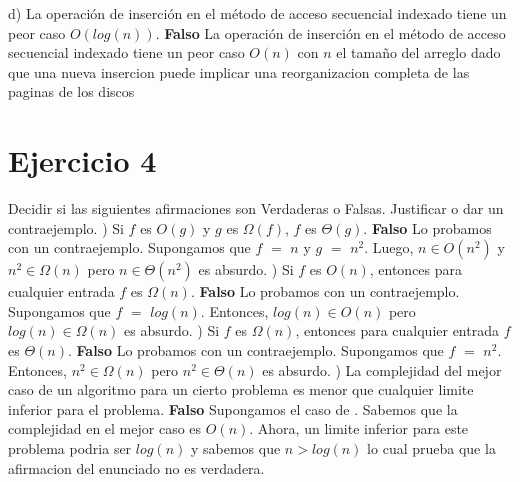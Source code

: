 \documentclass[10pt,a4paper]{article}
\begin{document}
\newline
\newline
d) La operación de inserción en el método de acceso secuencial indexado tiene un peor caso $O(log(n))$. \textbf{Falso}
\newline
\newline
La operación de inserción en el método de acceso secuencial indexado tiene un peor caso $O(n)$ con $n$ el tamaño del arreglo dado que una nueva insercion puede implicar una reorganizacion completa de las paginas de los discos  
\newpage

\section{Ejercicio 4}

Decidir si las siguientes afirmaciones son Verdaderas o Falsas. Justificar o dar un contraejemplo.
\newline
{}) Si $f$ es $O(g)$ y $g$ es $\Omega(f)$, $f$ es $\Theta(g)$. \textbf{Falso}
\newline
\newline
Lo probamos con un contraejemplo. Supongamos que $f$ $=$ $n$ y $g$ $=$ $n^{2}$. Luego, $n \in O(n^{2})$ y $n^{2} \in \Omega(n)$ pero $n \in \Theta(n^{2})$ es absurdo.
\newline
{}) Si $f$ es $O(n)$, entonces para cualquier entrada $f$ es $\Omega(n)$. \textbf{Falso}
\newline
\newline
Lo probamos con un contraejemplo. Supongamos que $f$ $=$ $log(n)$. Entonces, $log(n) \in O(n)$ pero $log(n) \in \Omega(n)$ es absurdo.
\newline
{}) Si $f$ es $\Omega(n)$, entonces para cualquier entrada $f$ es $\Theta(n)$. \textbf{Falso}
\newline
\newline
Lo probamos con un contraejemplo. Supongamos que $f$ $=$ $n^{2}$. Entonces, $n^{2} \in \Omega(n)$ pero $n^{2} \in \Theta(n)$ es absurdo.
\newline
{}) La complejidad del mejor caso de un algoritmo para un cierto problema es menor que cualquier limite inferior para el problema. \textbf{Falso}
\newline
\newline
Supongamos el caso de . Sabemos que la complejidad en el mejor caso es $O(n)$. Ahora, un limite inferior para este problema podria ser $log(n)$ y sabemos que $n > log(n)$ lo cual prueba que la afirmacion del enunciado no es verdadera.
\end{document}
